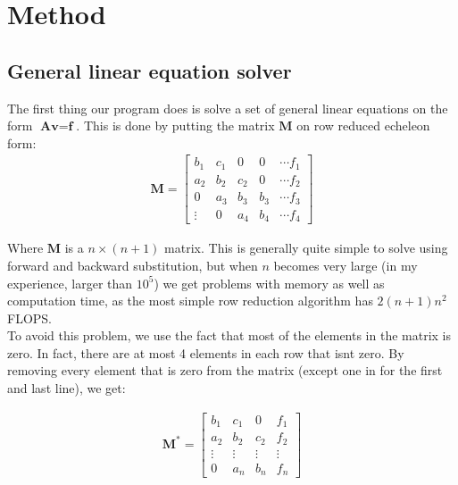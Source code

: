 \documentclass[a4paper,12pt,norsk]{article}
\begin{document}
	
\section{Method}
	\subsection{General linear equation solver}
	The first thing our program does is solve a set of general linear equations on the form $\textbf{A}\textbf{v} = \textbf{f}$. This is done by putting the matrix $\textbf{M}$ on row reduced echeleon form:
	\begin{gather*}
	\textbf{M} =  \left[
	\begin{array}{cccccc}
	b_1 & c_1 & 0 & 0 & \cdots f_1\\
	a_2 & b_2 & c_2 & 0 & \cdots f_2\\
	0 & a_3 & b_3 & b_3 & \cdots f_3\\
	\vdots & 0 & a_4 & b_4 & \cdots f_4
	\end{array}
	\right]
	\end{gather*}

	Where $\textbf{M}$ is a $n \times (n+1)$ matrix. This is generally quite simple to solve using forward and backward substitution, but when $n$ becomes very large (in my experience, larger than $10^5$) we get problems with memory as well as computation time, as the most simple row reduction algorithm has $2(n+1)n^2$ FLOPS.\\
	To avoid this problem, we use the fact that most of the elements in the matrix is zero. In fact, there are at most 4 elements in each row that isnt zero. By removing every element that is zero from the matrix (except one in for the first and last line), we get:

\begin{gather*}
	\textbf{M}^* = \left[
	\begin{array}{cccc}
	b_1 & c_1 & 0 & f_1\\
	a_2 & b_2 & c_2 & f_2\\
	\vdots & \vdots & \vdots & \vdots\\
	0 & a_n & b_n & f_n
	\end{array}
	\right]
	\end{gather*}
\end{document}
